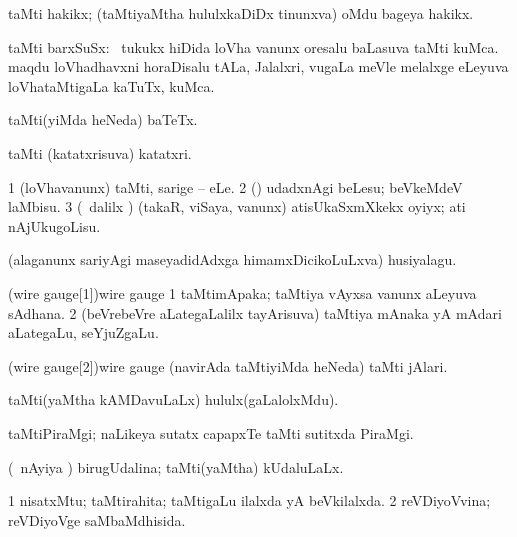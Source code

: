 \bentry
{}
\gl{\nA}
\bmng
taMti hakikx; (taMtiyaMtha hululxkaDiDx tinunxva) oMdu bageya hakikx. 
\emng
\eentry

\bentry
{}
\gl{\nA}
\bmng
taMti barxSuSx: 
\banum
{} \kanmu\ tukukx hiDida loVha \mo vanunx oresalu baLasuva taMti kuMca. 
 maqdu loVhadhavxni horaDisalu tALa, Jalalxri, \mo vugaLa meVle melalxge eLeyuva loVhataMtigaLa kaTuTx, kuMca. 
\eanum
\emng
\eentry

\bentry
{}
\gl{\nA}
\bmng
taMti(yiMda heNeda) baTeTx. 
\emng
\eentry

\bentry
{}
\gl{\nA}
\bmng
taMti (katatxrisuva) katatxri. 
\emng
\eentry

\bentry
{}
\gl{\sakirx} 
\bmng
\bnum
\num{1} (loVhavanunx) taMti, sarige -- eLe. 
\num{2} (\rUpa) udadxnAgi beLesu; beVkeMdeV laMbisu. 
\num{3} (\kanmu\ \BUkaq dalilx \parx) (takaR, viSaya, \mo vanunx) atisUkaSxmXkekx oyiyx; ati nAjUkugoLisu. 
\enum
\emng
\eentry

\bentry
{}
\gl{\nA}
\bmng
(alaganunx sariyAgi maseyadidAdxga himamxDicikoLuLxva) husiyalagu. 
\emng
\eentry

\bentry
\word(wire gauge[1]){wire gauge}
\gl{\nA}
\bmng
\bnum
\num{1} taMtimApaka; taMtiya vAyxsa \mo vanunx aLeyuva sAdhana. 
\num{2} (beVrebeVre aLategaLalilx tayArisuva) taMtiya mAnaka yA mAdari aLategaLu, seYjuZgaLu. 
\enum
\emng
\eentry

\bentry
\word(wire gauge[2]){wire gauge}
\gl{\nA}
\bmng
(navirAda taMtiyiMda heNeda) taMti jAlari. 
\emng
\eentry

\bentry
{}
\gl{\nA}
\bmng
taMti(yaMtha kAMDavuLaLx) hululx(gaLalolxMdu). 
\emng
\eentry

\bentry
{}
\gl{\nA}
\bmng
taMtiPiraMgi; naLikeya sutatx capapxTe taMti sutitxda PiraMgi. 
\emng
\eentry

\bentry
{}
\gl{\gu}
\bmng
(\kanmu\ nAyiya \vi) birugUdalina; taMti(yaMtha) kUdaluLaLx. 
\emng
\eentry

\bentry
{} 
\gl{\gu}
\expl{}
\bmng
\bnum
\num{1} nisatxMtu; taMtirahita; taMtigaLu ilalxda yA beVkilalxda. 
\num{2} reVDiyoVvina; reVDiyoVge saMbaMdhisida. 
\enum
\emng
\eentry

